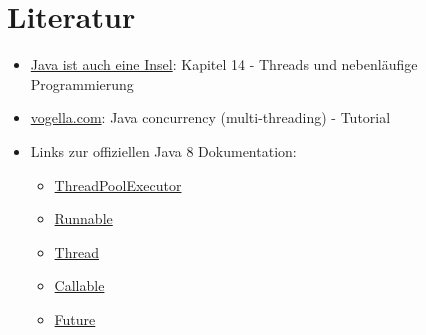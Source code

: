 \section{Literatur}
\begin{itemize}
    \item \href{http://openbook.galileocomputing.de/javainsel9/javainsel_14_004.htm}{Java ist auch eine Insel}: Kapitel 14 -
          Threads und nebenläufige Programmierung
    \item \href{http://www.vogella.com/tutorials/JavaConcurrency/article.html}{vogella.com}: Java concurrency (multi-threading) - Tutorial
    \item Links zur offiziellen Java 8 Dokumentation:
        \begin{itemize}
            \item \href{http://docs.oracle.com/javase/8/docs/api/java/util/concurrent/ThreadPoolExecutor.html}{ThreadPoolExecutor}
            \item \href{http://docs.oracle.com/javase/8/docs/api/java/lang/Runnable.html}{Runnable}
            \item \href{http://docs.oracle.com/javase/8/docs/api/java/lang/Thread.html}{Thread}
            \item \href{http://docs.oracle.com/javase/8/docs/api/java/util/concurrent/Callable.html}{Callable}
            \item \href{http://docs.oracle.com/javase/8/docs/api/java/util/concurrent/Future.html}{Future}
        \end{itemize}
\end{itemize}

